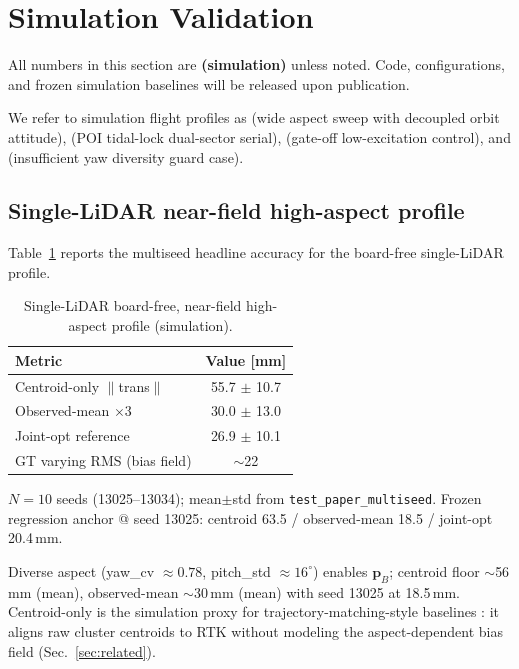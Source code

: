 \section{Simulation Validation}
\label{sec:sim}

All numbers in this section are \textbf{(simulation)} unless noted.
Code, configurations, and frozen simulation baselines will be released upon publication.

We refer to simulation flight profiles as \flightD{} (wide aspect sweep with
decoupled orbit attitude), \flightW{} (POI tidal-lock dual-sector serial),
\flightJ{} (gate-off low-excitation control), and \flightY{} (insufficient yaw
diversity guard case).

\subsection{Single-LiDAR near-field high-aspect profile}
Table~\ref{tab:p15} reports the multiseed headline accuracy for the board-free
single-LiDAR profile.
\begin{table}[t]
  \centering
  \caption{Single-LiDAR board-free, near-field high-aspect profile (simulation).}
  \label{tab:p15}
  \begin{tabular}{lc}
    \toprule
    Metric & Value [mm] \\
    \midrule
    Centroid-only $\|$trans$\|$ & 55.7 $\pm$ 10.7 \\
    Observed-mean $\times 3$ & 30.0 $\pm$ 13.0 \\
    Joint-opt reference & 26.9 $\pm$ 10.1 \\
    GT varying RMS (bias field) & $\sim$22 \\
    \bottomrule
  \end{tabular}
  \vspace{1mm}

  {\footnotesize $N{=}10$ seeds (13025--13034); mean$\pm$std from
  \texttt{test\_paper\_multiseed}.
  Frozen regression anchor @ seed 13025: centroid 63.5 / observed-mean 18.5 /
  joint-opt 20.4\,mm.}
\end{table}

Diverse aspect (yaw\_cv $\approx 0.78$, pitch\_std $\approx 16^\circ$) enables
$\mathbf{p}_B$; centroid floor $\sim$56\,mm (mean), observed-mean $\sim$30\,mm
(mean) with seed 13025 at 18.5\,mm.
Centroid-only is the simulation proxy for trajectory-matching-style baselines
\cite{ren2023trajmatch}: it aligns raw cluster centroids to RTK without modeling the
aspect-dependent bias field (Sec.~\ref{sec:related}).

